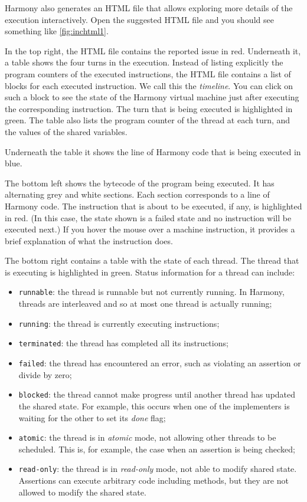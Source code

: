 \documentclass{report}
\begin{document}
Harmony also generates an HTML file that allows exploring more details
of the execution interactively.
Open the suggested HTML file and you should see something like
\autoref{fig:inchtml1}.

In the top right, the HTML file contains the reported issue in red.
Underneath it, a table shows the four turns in the execution.
Instead of listing explicitly the program counters of the executed
instructions, the HTML file contains a list of blocks for each
executed instruction.  We call this the \emph{timeline}.
You can click on such a block to see the state of the Harmony
virtual machine just after executing the corresponding instruction.
The turn that is being executed is highlighted in green.
The table also lists the program counter of the thread at each turn,
and the values of the shared variables.

Underneath the table it shows the line of Harmony code that is being
executed in blue.

The bottom left shows
the bytecode of the program being executed.  It has alternating
grey and white sections.  Each section corresponds to a line of
Harmony code.  The instruction that is about to be executed,
if any, is highlighted in red.  (In this case, the state shown
is a failed state and no instruction will be executed next.)
If you hover the mouse over a machine instruction, it provides a
brief explanation of what the instruction does.

The bottom right contains a table with the state of each thread.
The thread that is executing is highlighted in green.
Status information for a thread can include:
\begin{itemize}
\item[] \texttt{runnable}: the thread is runnable but not
currently running.  In Harmony, threads are interleaved and so
at most one thread is actually running;
\item[] \texttt{running}: the thread is currently executing
instructions;
\item[] \texttt{terminated}: the thread has completed all its
instructions;
\item[] \texttt{failed}: the thread has encountered an error,
such as violating an assertion or divide by zero;
\item[] \texttt{blocked}: the thread cannot make progress until
another thread has updated the shared state.  For example, this
occurs when one of the implementers is waiting for the other
to set its \textit{done} flag;
\item[] \texttt{atomic}: the thread is in \emph{atomic} mode,
not allowing other threads to be scheduled.  This is, for example,
the case when an assertion is being checked;
\item[] \texttt{read-only}: the thread is in \emph{read-only} mode,
not able to modify shared state.  Assertions can execute
arbitrary code including methods, but they are not allowed to
modify the shared state.
\end{itemize}
\end{document}
